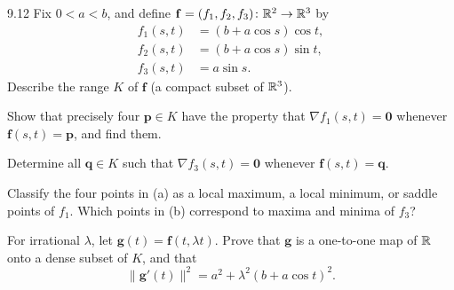 \documentclass[11pt,oneside]{article}
\begin{document}
\begin{exercise}{9.12}
Fix $0<a<b$, and define $\mathbf f=(f_1,f_2,f_3)\colon\mathbb{R}^2\to\mathbb{R}^3$ by
\[
 \begin{aligned}
 f_1(s,t)&=(b+a\cos s)\cos t,\\
 f_2(s,t)&=(b+a\cos s)\sin t,\\
 f_3(s,t)&=a\sin s.
 \end{aligned}
\]
Describe the range $K$ of $\mathbf f$ (a compact subset of $\mathbb{R}^3$).
\begin{exercisesubparts}
\item Show that precisely four $\mathbf p\in K$ have the property that $\nabla f_1(s,t)=\mathbf0$ whenever $\mathbf f(s,t)=\mathbf p$, and find them.
\item Determine all $\mathbf q\in K$ such that $\nabla f_3(s,t)=\mathbf0$ whenever $\mathbf f(s,t)=\mathbf q$.
\item Classify the four points in (a) as a local maximum, a local minimum, or saddle points of $f_1$. Which points in (b) correspond to maxima and minima of $f_3$?
\item For irrational $\lambda$, let $\mathbf g(t)=\mathbf f(t,\lambda t)$. Prove that $\mathbf g$ is a one-to-one map of $\mathbb{R}$ onto a dense subset of $K$, and that
\[
 \|\mathbf g'(t)\|^2=a^2+\lambda^2(b+a\cos t)^2.
\]
\end{exercisesubparts}
\end{exercise}
\end{document}
